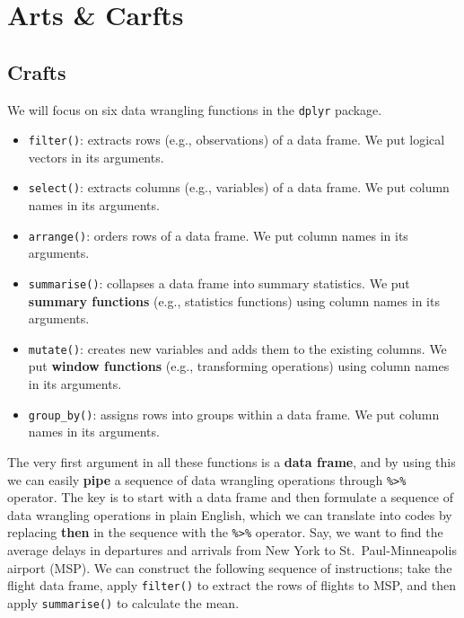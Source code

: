 \documentclass[]{book}
\theoremstyle{definition}
\theoremstyle{definition}
\theoremstyle{remark}
\begin{document}
\section{Arts \& Carfts}\label{arts-carfts}

\subsection*{Crafts}\label{crafts}

We will focus on six data wrangling functions in the \texttt{dplyr}
package.

\begin{itemize}
\item
  \texttt{filter()}: extracts rows (e.g., observations) of a data frame.
  We put logical vectors in its arguments.
\item
  \texttt{select()}: extracts columns (e.g., variables) of a data frame.
  We put column names in its arguments.
\item
  \texttt{arrange()}: orders rows of a data frame. We put column names
  in its arguments.
\item
  \texttt{summarise()}: collapses a data frame into summary statistics.
  We put \textbf{summary functions} (e.g., statistics functions) using
  column names in its arguments.
\item
  \texttt{mutate()}: creates new variables and adds them to the existing
  columns. We put \textbf{window functions} (e.g., transforming
  operations) using column names in its arguments.
\item
  \texttt{group\_by()}: assigns rows into groups within a data frame. We
  put column names in its arguments.
\end{itemize}

The very first argument in all these functions is a \textbf{data frame},
and by using this we can easily \textbf{pipe} a sequence of data
wrangling operations through \texttt{\%\textgreater{}\%} operator. The
key is to start with a data frame and then formulate a sequence of data
wrangling operations in plain English, which we can translate into codes
by replacing \textbf{then} in the sequence with the
\texttt{\%\textgreater{}\%} operator. Say, we want to find the average
delays in departures and arrivals from New York to St.~Paul-Minneapolis
airport (MSP). We can construct the following sequence of instructions;
take the flight data frame, apply \texttt{filter()} to extract the rows
of flights to MSP, and then apply \texttt{summarise()} to calculate the
mean.
\end{document}
